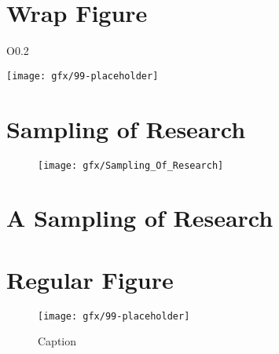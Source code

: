 \section{Wrap Figure}
\begin{wrapfigure}{O}{0.2\textwidth}
	\caption{} %
	\label{03:fig02} 
	\centering
	\texttt{[image: gfx/99-placeholder]} 
\end{wrapfigure}


\section{Sampling of Research}
\begin{figure}[H]
	\centering
	\texttt{[image: gfx/Sampling\_Of\_Research]}
	\caption*{}
	\label{05:sampling_of_research}
\end{figure}
\section{A Sampling of Research}



\section{Regular Figure}
\begin{figure}[H]
	\centering
	\texttt{[image: gfx/99-placeholder]}
	\caption{Caption}
	\label{03:fig03}
\end{figure}



